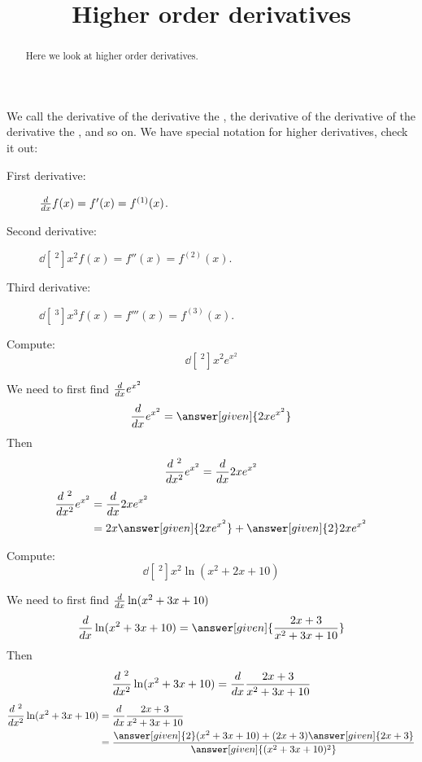 \documentclass{ximera}
\title[Dig-In:]{Higher order derivatives}
\begin{document}
\begin{abstract}
 Here we look at higher order derivatives.   
\end{abstract}
\maketitle

We call the derivative of the derivative the , the derivative of the derivative of the derivative the
, and so on. We have special notation for
higher derivatives, check it out:
\begin{description}
\item[First derivative:] $\ddx f(x) = f'(x) = f^{(1)}(x)$.
\item[Second derivative:] $\dd[~^2]{x^2} f(x) = f''(x) = f^{(2)}(x)$.
\item[Third derivative:] $\dd[~^3]{x^3} f(x) = f'''(x) = f^{(3)}(x)$.
\end{description}



\begin{example}
Compute:
\[
\dd[~^2]{x^2} e^{x^{2}}
\]

\begin{explanation}
We need to first find $\ddx e^{x^{2}}$
\[
\ddx e^{x^{2}} =  \answer[given]{2xe^{x^{2}}}\\
\]
Then
\[
\dd[~^2]{x^2} e^{x^{2}} =  \ddx 2xe^{x^{2}}
\]
\begin{align*}
\dd[~^2]{x^2} e^{x^{2}} &=  \ddx 2xe^{x^{2}}\\ 
&= 2x \answer[given]{ 2xe^{x^{2}} }+ \answer[given]{2} 2xe^{x^{2}}
\end{align*}
\end{explanation}
\end{example}

\begin{example}
Compute:
\[
\dd[~^2]{x^2} \ln (x^{2}+2x+10)
\]

\begin{explanation}
We need to first find $\ddx  \ln (x^{2}+3x+10)$
\[
\ddx \ln (x^{2}+3x+10) =  \answer[given]{\frac{2x+3}{x^{2}+3x+10}}\\
\]
Then
\[
\dd[~^2]{x^2} \ln (x^{2}+3x+10) =  \ddx \frac{2x+3}{x^{2}+3x+10}
\]
\begin{align*}
\dd[~^2]{x^2} \ln (x^{2}+3x+10) &=  \ddx \frac{2x+3}{x^{2}+3x+10}\\ 
&=  \frac{ \answer[given]{2}(x^{2}+3x+10)+ (2x+3)\answer[given]{2x+3} }{ \answer[given]{(x^{2}+3x+10)^{2} }}
\end{align*}
\end{explanation}
\end{example}
\end{document}

